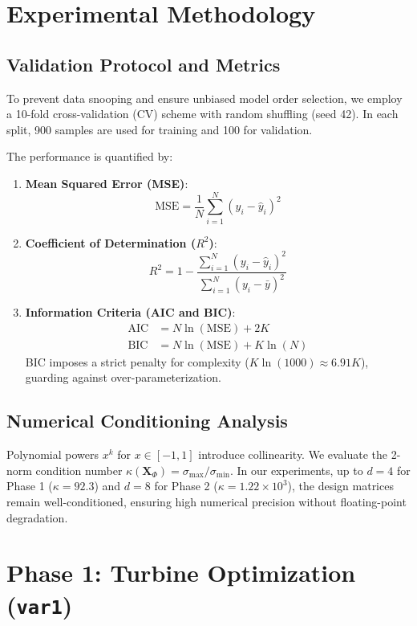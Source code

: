 \documentclass[10pt,twocolumn,a4paper]{article}
\begin{document}
\section{Experimental Methodology}

\subsection{Validation Protocol and Metrics}
To prevent data snooping and ensure unbiased model order selection, we employ a 10-fold cross-validation (CV) scheme with random shuffling (seed 42). In each split, 900 samples are used for training and 100 for validation.

The performance is quantified by:
\begin{enumerate}
    \item \textbf{Mean Squared Error (MSE)}:
    \begin{equation}
    \text{MSE} = \frac{1}{N} \sum_{i=1}^N (y_i - \hat{y}_i)^2
    \end{equation}
    \item \textbf{Coefficient of Determination ($R^2$)}:
    \begin{equation}
    R^2 = 1 - \frac{\sum_{i=1}^N (y_i - \hat{y}_i)^2}{\sum_{i=1}^N (y_i - \bar{y})^2}
    \end{equation}
    \item \textbf{Information Criteria (AIC and BIC)}:
    \begin{align}
    \text{AIC} &= N \ln(\text{MSE}) + 2K \\
    \text{BIC} &= N \ln(\text{MSE}) + K \ln(N)
    \end{align}
    BIC imposes a strict penalty for complexity ($K \ln(1000) \approx 6.91K$), guarding against over-parameterization.
\end{enumerate}

\subsection{Numerical Conditioning Analysis}
Polynomial powers $x^k$ for $x \in [-1, 1]$ introduce collinearity. We evaluate the 2-norm condition number $\kappa(\mathbf{X}_\Phi) = \sigma_{\max} / \sigma_{\min}$. In our experiments, up to $d=4$ for Phase 1 ($\kappa = 92.3$) and $d=8$ for Phase 2 ($\kappa = 1.22 \times 10^3$), the design matrices remain well-conditioned, ensuring high numerical precision without floating-point degradation.

\section{Phase 1: Turbine Optimization (\texttt{var1})}
\end{document}

